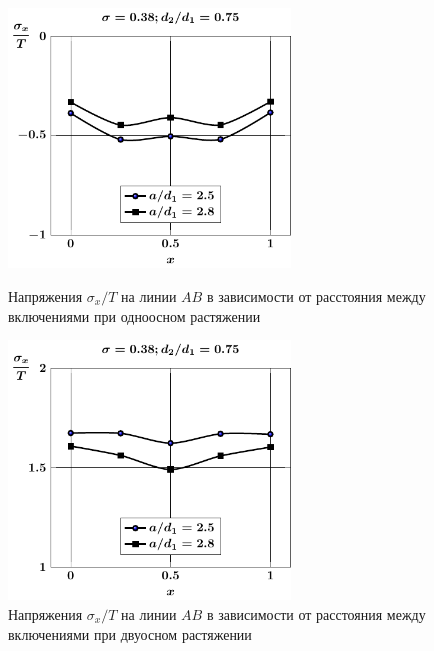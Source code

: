 \begin{figure}[h!]
\centering\footnotesize
\parbox[b]{7.5cm}{\centering\includegraphics[width=7.5cm]{periodic-inc27-a-d75-g25-t1-sig_x.pdf}
\caption{Напряжения $\sigma_x/T$ на линии $AB$ в зависимости от расстояния между включениями при одноосном растяжении
\label{f:11:25}}}\hfil\hfil
\parbox[b]{7.5cm}{\centering\includegraphics[width=7.5cm]{periodic-inc27-a-d75-g25-t2-sig_x.pdf}
\caption{Напряжения $\sigma_x/T$ на линии $AB$ в зависимости от расстояния между включениями при двуосном растяжении
\label{f:11:26}}}
\end{figure}

